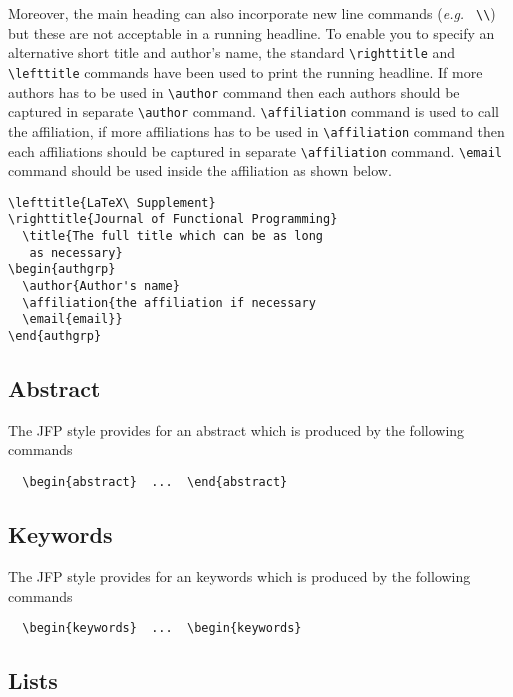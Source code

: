 \documentclass{jfp}
\begin{document}
Moreover, the main heading can also incorporate new line commands
({\it e.g.\ } \verb"\\") but these are not acceptable in a running headline.
To enable you to specify an alternative short title and author's name, the
standard \verb"\righttitle" and \verb"\lefttitle" commands have been used to print the running headline. If more authors has to be used in \verb"\author" command then each authors should be captured in separate \verb"\author" command.
\verb"\affiliation" command is used to call the affiliation, if more affiliations has to be used in \verb"\affiliation" command then each affiliations should be captured in separate \verb"\affiliation" command.
\verb"\email" command should be used inside the affiliation as shown below.
%
\begin{verbatim}
\lefttitle{LaTeX\ Supplement}
\righttitle{Journal of Functional Programming}
  \title{The full title which can be as long
   as necessary}
\begin{authgrp}
  \author{Author's name}
  \affiliation{the affiliation if necessary
  \email{email}}
\end{authgrp}
\end{verbatim}
%

\subsection{Abstract}

The JFP style provides for an abstract which is produced by the following
commands
%
\begin{verbatim}
  \begin{abstract}  ...  \end{abstract}
\end{verbatim}

\subsection{Keywords}

The JFP style provides for an keywords which is produced by the following
commands
%
\begin{verbatim}
  \begin{keywords}  ...  \begin{keywords}
\end{verbatim}

\subsection{Lists}
\end{document}
